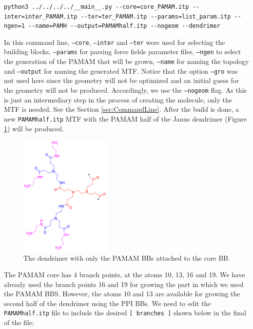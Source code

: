 \begin{lstlisting}
python3 ../../../../__main__.py --core=core_PAMAM.itp --inter=inter_PAMAM.itp --ter=ter_PAMAM.itp --params=list_param.itp --ngen=1 --name=PAMH --output=PAMAMhalf.itp --nogeom --dendrimer
\end{lstlisting}

In this command line, \texttt{--core}, \texttt{--inter} and \texttt{--ter} were used for selecting the building blocks, \texttt{--params} for parsing force fields parameter files, \texttt{--ngen} to select the generation of the PAMAM that will be grown, \texttt{--name} for naming the topology and \texttt{--output} for naming the generated MTF.
Notice that the option \texttt{--gro} was not used here since the geometry will not be optimized and an initial guess for the geometry will not be produced.
Accordingly, we use the \texttt{--nogeom} flag.
As this is just an intermediary step in the process of creating the molecule, only the MTF is needed.
See the Section \ref{sec:CommandLine}.
After the build is done, a new \texttt{PAMAMhalf.itp} MTF with the PAMAM half of the Janus dendrimer (Figure \ref{fig:JanusPAMAMhalf}) will be produced.

\begin{figure}
    \centering
    \includegraphics[width=0.4\textwidth]{PAMAM_PPI-Janus/JANUSPAMAMhalf.png}
    \caption{The dendrimer with only the PAMAM BBs attached to the core BB.}
    \label{fig:JanusPAMAMhalf}
\end{figure}

The PAMAM core has 4 branch points, at the atoms 10, 13, 16 and 19.
We have already used the branch points 16 and 19 for growing the part in which we used the PAMAM BBS.
However, the atoms 10 and 13 are available for growing the second half of the dendrimer using the PPI BBs.
We need to edit the \texttt{PAMAMhalf.itp} file
to include the desired \texttt{[ branches ]} shown below in the final of the file:

